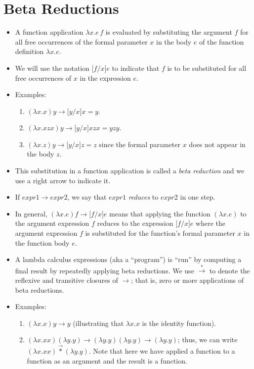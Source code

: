 \documentclass[]{article}
\begin{document}
\section{Beta Reductions}
\begin{itemize}
\item A function application $\lambda x.e\,f$ is evaluated by substituting the argument $f$ for all free occurrences of the formal parameter $x$ in the body $e$ of the function definition $\lambda x.e$.
\item We will use the notation $\lbrack f/x\rbrack e$ to indicate that $f$ is to be substituted for all free occurrences of $x$ in the expression $e$.
\item Examples:
\begin{enumerate}
\item $(\lambda x.x)y \rightarrow \lbrack y/x \rbrack x = y$.
\item $(\lambda x.xzx)y \rightarrow \lbrack y/x \rbrack xzx = yzy$.
\item $(\lambda x.z)y \rightarrow \lbrack y/x \rbrack z = z$ since the formal parameter $x$ does not appear in the body $z$.
\end{enumerate}
\item This substitution in a function application is called a \emph{beta reduction} and we use a right arrow to indicate it.
\item If $expr1 \rightarrow expr2$, we say that $expr1$ \emph{reduces} to $expr2$ in one step.
\item In general, $(\lambda x.e)f \rightarrow \lbrack f/x \rbrack e$ means that applying the function $(\lambda x.e)$ to the argument expression $f$ reduces to the expression $\lbrack f/x \rbrack e$ where the argument expression $f$ is substituted for the function's formal parameter $x$ in the function body $e$.
\item A lambda calculus expressions (aka a ``program'') is ``run'' by computing a final result by repeatedly applying beta reductions. We use $\overset{*}{\rightarrow}$ to denote the reflexive and transitive closures of $\rightarrow$; that is, zero or more applications of beta reductions.
\item Examples:
\begin{enumerate}
\item $(\lambda x.x)y \rightarrow y$ (illustrating that $\lambda x.x$ is the identity function).
\item $(\lambda x.xx)(\lambda y.y) \rightarrow (\lambda y.y)(\lambda y.y) \rightarrow (\lambda y.y)$; thus, we can write $(\lambda x.xx)\overset{\rightarrow}{*}(\lambda y.y)$. Note that here we have applied a function to a function as an argument and the result is a function.
\end{enumerate}
\end{itemize}
\end{document}
